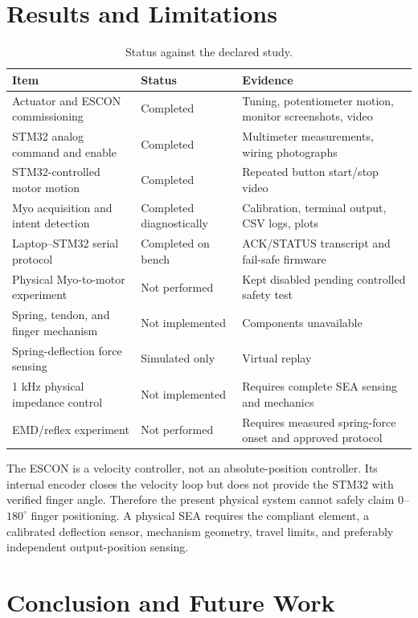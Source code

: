 \documentclass[11pt,a4paper]{report}
\begin{document}
\chapter{Results and Limitations}

\begin{table}[H]
\centering
\caption{Status against the declared study.}
\begin{tabular}{p{}p{}p{}}
\toprule
Item & Status & Evidence\\
\midrule
Actuator and ESCON commissioning & Completed & Tuning, potentiometer motion, monitor screenshots, video\\
STM32 analog command and enable & Completed & Multimeter measurements, wiring photographs\\
STM32-controlled motor motion & Completed & Repeated button start/stop video\\
Myo acquisition and intent detection & Completed diagnostically & Calibration, terminal output, CSV logs, plots\\
Laptop--STM32 serial protocol & Completed on bench & ACK/STATUS transcript and fail-safe firmware\\
Physical Myo-to-motor experiment & Not performed & Kept disabled pending controlled safety test\\
Spring, tendon, and finger mechanism & Not implemented & Components unavailable\\
Spring-deflection force sensing & Simulated only & Virtual replay\\
1 kHz physical impedance control & Not implemented & Requires complete SEA sensing and mechanics\\
EMD/reflex experiment & Not performed & Requires measured spring-force onset and approved protocol\\
\bottomrule
\end{tabular}
\end{table}

The ESCON is a velocity controller, not an absolute-position controller. Its internal encoder closes the velocity loop but does not provide the STM32 with verified finger angle. Therefore the present physical system cannot safely claim $0$--$180^\circ$ finger positioning. A physical SEA requires the compliant element, a calibrated deflection sensor, mechanism geometry, travel limits, and preferably independent output-position sensing.

\chapter{Conclusion and Future Work}
\end{document}
